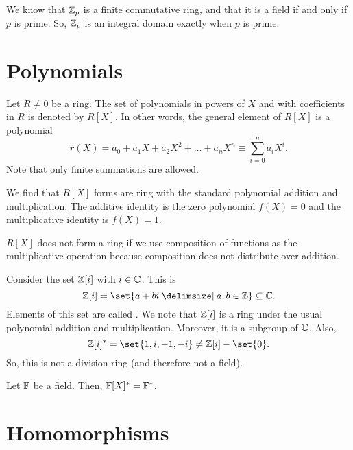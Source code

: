 \documentclass[11pt]{penrose}
\begin{document}
\begin{negg}
    We know that $\mathbb{Z}_p$ is a finite commutative ring, and that it is a field if and only if $p$ is prime. So, $\mathbb{Z}_p$ is an integral domain exactly when $p$ is prime.
\end{negg}

\section{Polynomials}

\begin{negg}
    Let $R \neq 0$ be a ring. The set of polynomials in powers of $X$ and with coefficients in $R$ is denoted by $R[X]$. In other words, the general element of $R[X]$ is a polynomial
    \begin{equation*}
        r(X) = a_0 + a_1 X + a_2 X^2 + \dots + a_n X^n \equiv \sum_{i=0}^n a_i X^i.
    \end{equation*}
    Note that only finite summations are allowed.

    We find that $R[X]$ forms are ring with the standard polynomial addition and multiplication. The additive identity is the zero polynomial $f(X) = 0$ and the multiplicative identity is $f(X) = 1$.

    $R[X]$ does not form a ring if we use composition of functions as the multiplicative operation because composition does not distribute over addition.
\end{negg}

\begin{negg}
    Consider the set $\mathbb{Z}[i]$ with $i \in \mathbb{C}$. This is
    \begin{equation*}
        \Z[i] = \set{a + bi \st a, b \in \Z} \subseteq \C.
    \end{equation*}
    Elements of this set are called . We note that $\mathbb{Z}[i]$ is a ring under the usual polynomial addition and multiplication. Moreover, it is a subgroup of $\mathbb{C}$. Also,
    \begin{equation*}
        \Z[i]^* = \set{1, i, -1, -i} \neq \Z[i] - \set{0}.
    \end{equation*}
    So, this is not a division ring (and therefore not a field).
\end{negg}

\begin{nlemma}
    Let $\mathbb{F}$ be a field. Then, $\mathbb{F}[X]^* = \mathbb{F}^*$.
\end{nlemma}

\section{Homomorphisms}
\end{document}

